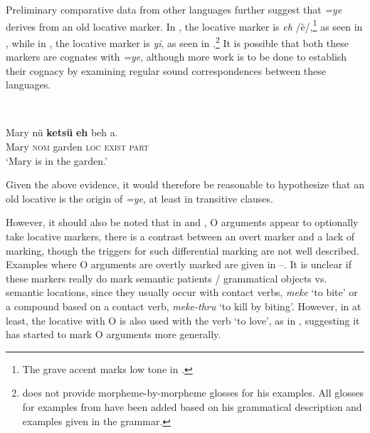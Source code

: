 \documentclass[output=paper]{LSP/langsci}
\begin{document}
Preliminary comparative data from other  languages further suggest that  \textit{=ye} derives from an old locative marker. In , the locative marker is \textit{eh} /è/,\footnote{The grave accent marks low tone in .} as seen in , while in , the locative marker is \textit{yi}, as seen in .\footnote{\citet{Giridhar1994Mao} does not provide morpheme-by-morpheme glosses for his examples. All glosses for examples from  have been added based on his grammatical description and examples given in the grammar.}
 It is possible that both these markers are cognates with  \textit{=ye}, although more work is to be done to establish their cognacy by examining regular sound correspondences between these languages.

\ea 
{}\\
\label{13-te-ex:33}

\gll Mary nü \textbf{ketsü} \textbf{eh} beh a.\\
Mary \textsc{nom} garden \textsc{loc} \textsc{exist} \textsc{part}\\
\glt `Mary is in the garden.’
\z

Given the above evidence, it would therefore be reasonable to hypothesize that an old  locative is the origin of  \textit{=ye}, at least in transitive clauses.

However, it should also be noted that in  and , O arguments appear to optionally take locative markers, \ie there is a contrast between an overt marker and a lack of marking, though the triggers for such differential marking are not well described. Examples where O arguments are overtly marked are given in --. 
It is unclear if these markers really do mark semantic patients / grammatical objects vs. semantic locations, since they usually occur with contact verbs, \eg \textit{meke} ‘to bite’ or a compound based on a contact verb, \eg \textit{meke-thru} ‘to kill by biting’. However, in  at least, the locative with O is also used with the verb ‘to love’, as in , suggesting it has started to mark O arguments more generally.
\end{document}
